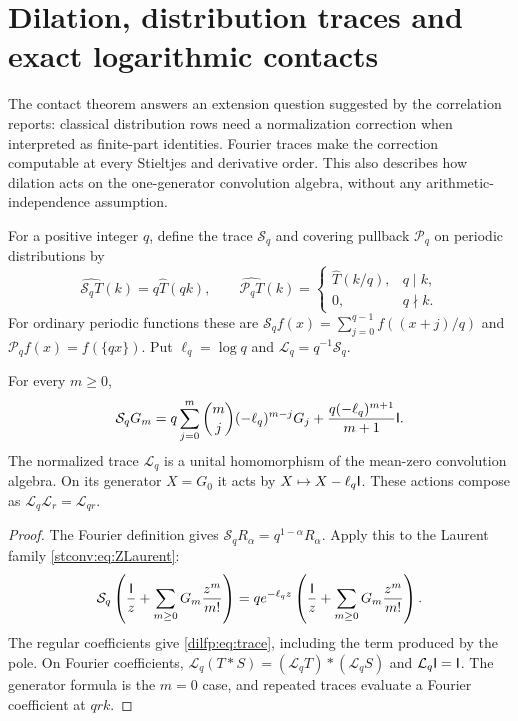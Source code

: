 \section{Dilation, distribution traces and exact logarithmic contacts}
\label{dilfp:sec:main}
The contact theorem answers an extension question suggested by the
correlation reports: classical distribution rows need a normalization
correction when interpreted as finite-part identities. Fourier traces
make the correction computable at every Stieltjes and derivative order.
This also describes how dilation acts on the one-generator convolution
algebra, without any arithmetic-independence assumption.

For a positive integer $q$, define the trace $\mathcal S_q$ and covering
pullback $\mathcal P_q$ on periodic distributions by
\[
 \widehat{\mathcal S_qT}(k)=q\widehat T(qk),\qquad
 \widehat{\mathcal P_qT}(k)=
 \begin{cases}\widehat T(k/q),&q\mid k,\\0,&q\nmid k.\end{cases}
\]
For ordinary periodic functions these are
$\mathcal S_qf(x)=\sum_{j=0}^{q-1}f((x+j)/q)$ and
$\mathcal P_qf(x)=f(\{qx\})$. Put $\ell_q=\log q$ and
$\mathcal L_q=q^{-1}\mathcal S_q$.

\begin{theorem}
\label{dilfp:thm:trace}
For every $m\ge0$,
\begin{equation}\label{dilfp:eq:trace}
 \mathcal S_qG_m
 =q\sum_{j=0}^m\binom mj(-\ell_q)^{m-j}G_j
   +\frac{q(-\ell_q)^{m+1}}{m+1}\mathsf I.
\end{equation}
The normalized trace $\mathcal L_q$ is a unital homomorphism of the
mean-zero convolution algebra. On its generator $X=G_0$ it acts by
$X\mapsto X-\ell_q\mathsf I$. These actions compose as
$\mathcal L_q\mathcal L_r=\mathcal L_{qr}$.
\end{theorem}
\begin{proof}
The Fourier definition gives
$\mathcal S_qR_\alpha=q^{1-\alpha}R_\alpha$. Apply this to the
Laurent family \eqref{stconv:eq:ZLaurent}:
\[
 \mathcal S_q\left(\frac{\mathsf I}{z}
                  +\sum_{m\ge0}G_m\frac{z^m}{m!}\right)
 =q e^{-\ell_qz}\left(\frac{\mathsf I}{z}
                  +\sum_{m\ge0}G_m\frac{z^m}{m!}\right).
\]
The regular coefficients give \eqref{dilfp:eq:trace}, including the
term produced by the pole. On Fourier coefficients,
$\mathcal L_q(T*S)=(\mathcal L_qT)*(\mathcal L_qS)$ and
$\mathcal L_q\mathsf I=\mathsf I$. The generator formula is the
$m=0$ case, and repeated traces evaluate a Fourier coefficient at $qrk$.
\end{proof}


